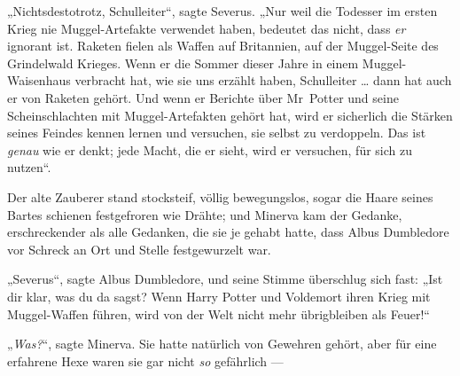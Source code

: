„Nichtsdestotrotz, Schulleiter“, sagte Severus.
„Nur weil die Todesser im ersten Krieg nie Muggel-Artefakte verwendet haben, bedeutet das nicht, dass \emph{er} ignorant ist. Raketen fielen als Waffen auf Britannien, auf der Muggel-Seite des Grindelwald Krieges. Wenn er die Sommer dieser Jahre in einem Muggel-Waisenhaus verbracht hat, wie sie uns erzählt haben, Schulleiter … dann hat auch er von Raketen gehört. Und wenn er Berichte über Mr~Potter und seine Scheinschlachten mit Muggel-Artefakten gehört hat, wird er sicherlich die Stärken seines Feindes kennen lernen und versuchen, sie selbst zu verdoppeln. Das ist \emph{genau} wie er denkt; jede Macht, die er sieht, wird er versuchen, für sich zu nutzen“.

Der alte Zauberer stand stocksteif, völlig bewegungslos, sogar die Haare seines Bartes schienen festgefroren wie Drähte; und Minerva kam der Gedanke, erschreckender als alle Gedanken, die sie je gehabt hatte, dass Albus Dumbledore vor Schreck an Ort und Stelle festgewurzelt war.

„Severus“, sagte Albus Dumbledore, und seine Stimme überschlug sich fast:
„Ist dir klar, was du da sagst? Wenn Harry Potter und Voldemort ihren Krieg mit Muggel-Waffen führen, wird von der Welt nicht mehr übrigbleiben als Feuer!“

„\emph{Was?}“, sagte Minerva. Sie hatte natürlich von Gewehren gehört, aber für eine erfahrene Hexe waren sie gar nicht \emph{so} gefährlich —

